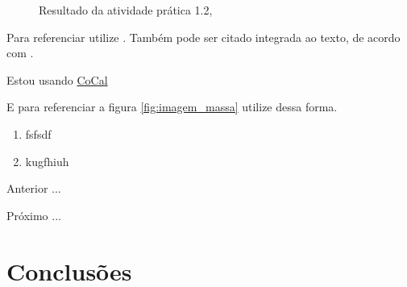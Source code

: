 \begin{figure}[H] %
  \center
  \caption{Resultado da atividade prática 1.2, \cite{oliveira_SO2009}}\label{fig:ap1_cod_vigual1}
\end{figure}



Para referenciar utilize \cite{ninguem2022curioso}. Também pode ser citado integrada ao texto, de acordo com .


\par Estou usando \href {https://cocalc.com/} {CoCal}

E para referenciar a figura \ref{fig:imagem_massa} utilize dessa forma.


\begin{enumerate}[label=\Roman{*}, ref=(\roman{*})]
  \item fsfsdf
  \item kugfhiuh
\end{enumerate}

\begin{asparaenum}
\item Anterior ... \cite{ninguem2022curioso}
\item Próximo ... \label{pl1}
\end{asparaenum}



\section{Conclusões}




